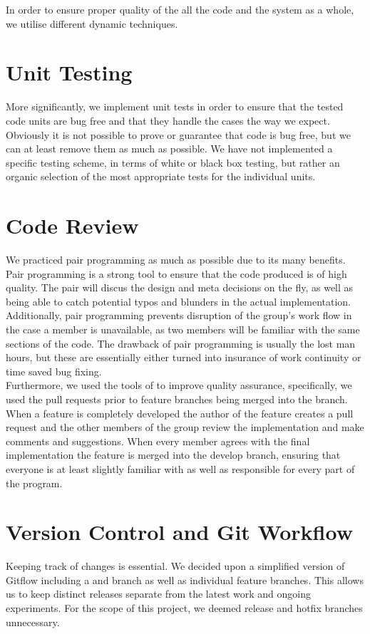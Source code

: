 In order to ensure proper quality of the all the code and the system as a whole, we utilise different dynamic techniques.

\section{Unit Testing}
More significantly, we implement unit tests in order to ensure that the tested code units are bug free and that they handle the cases the way we expect. Obviously it is not possible to prove or guarantee that code is bug free, but we can at least remove them as much as possible. We have not implemented a specific testing scheme, in terms of white or black box testing, but rather an organic selection of the most appropriate tests for the individual units.

\section{Code Review}
We practiced pair programming as much as possible due to its many benefits. \\
Pair programming is a strong tool to ensure that the code produced is of high quality. The pair will discus the design and meta decisions on the fly, as well as being able to catch potential typos and blunders in the actual implementation. Additionally, pair programming prevents disruption of the group's work flow in the case a member is unavailable, as two members will be familiar with the same sections of the code. The drawback of pair programming is usually the lost man hours, but these are essentially either turned into insurance of work continuity or time saved bug fixing. \\
Furthermore, we used the tools of  to improve quality assurance, specifically, we used the pull requests prior to feature branches being merged into the  branch. When a feature is completely developed the author of the feature creates a pull request and the other members of the group review the implementation and make comments and suggestions. When every member agrees with the final implementation the feature is merged into the develop branch, ensuring that everyone is at least slightly familiar with as well as responsible for every part of the program.

\section{Version Control and Git Workflow}
Keeping track of changes is essential. We decided upon a simplified version of Gitflow including a  and  branch as well as individual feature branches. This allows us to keep distinct releases separate from the latest work and ongoing experiments. For the scope of this project, we deemed release and hotfix branches unnecessary.

